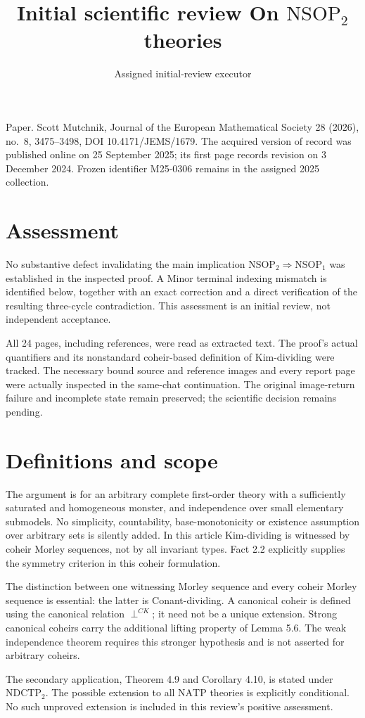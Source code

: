 \documentclass[10pt]{article}
\title{Initial scientific review
On \(\mathrm{NSOP}_2\) theories}
\author{Assigned initial-review executor}
\date{}
\begin{document}
\maketitle
Paper. Scott Mutchnik, Journal of the European Mathematical Society 28 (2026), no. 8, 3475–3498, DOI 10.4171/JEMS/1679. The acquired version of record was published online on 25 September 2025; its first page records revision on 3 December 2024. Frozen identifier M25-0306 remains in the assigned 2025 collection.\par
\section*{Assessment}
No substantive defect invalidating the main implication \(\mathrm{NSOP}_2\Rightarrow\mathrm{NSOP}_1\) was established in the inspected proof. A Minor terminal indexing mismatch is identified below, together with an exact correction and a direct verification of the resulting three-cycle contradiction. This assessment is an initial review, not independent acceptance.\par
All 24 pages, including references, were read as extracted text. The proof’s actual quantifiers and its nonstandard coheir-based definition of Kim-dividing were tracked. The necessary bound source and reference images and every report page were actually inspected in the same-chat continuation. The original image-return failure and incomplete state remain preserved; the scientific decision remains pending.\par
\section*{Definitions and scope}
The argument is for an arbitrary complete first-order theory with a sufficiently saturated and homogeneous monster, and independence over small elementary submodels. No simplicity, countability, base-monotonicity or existence assumption over arbitrary sets is silently added. In this article Kim-dividing is witnessed by coheir Morley sequences, not by all invariant types. Fact 2.2 explicitly supplies the symmetry criterion in this coheir formulation.\par
The distinction between one witnessing Morley sequence and every coheir Morley sequence is essential: the latter is Conant-dividing. A canonical coheir is defined using the canonical relation \(\mathrel{\perp}^{CK}\); it need not be a unique extension. Strong canonical coheirs carry the additional lifting property of Lemma 5.6. The weak independence theorem requires this stronger hypothesis and is not asserted for arbitrary coheirs.\par
The secondary application, Theorem 4.9 and Corollary 4.10, is stated under \(\mathrm{NDCTP}_2\). The possible extension to all \(\mathrm{NATP}\) theories is explicitly conditional. No such unproved extension is included in this review’s positive assessment.\par
\end{document}

